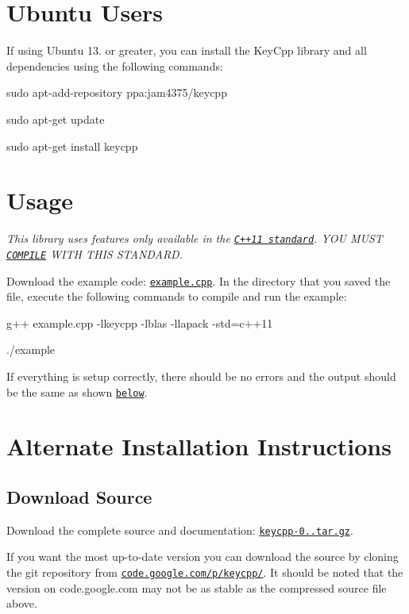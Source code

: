 \section*{Ubuntu Users}

If using Ubuntu 13. or greater, you can install the Key\-Cpp library and all dependencies using the following commands\-:

{\ttfamily sudo apt-\/add-\/repository ppa\-:jam4375/keycpp}

{\ttfamily sudo apt-\/get update}

{\ttfamily sudo apt-\/get install keycpp}

\section*{\label{_usage}%
Usage}

{\itshape This library uses features only available in the \href{https://en.wikipedia.org/wiki/C%2B%2B11}{\tt C++11 standard}. Y\-O\-U M\-U\-S\-T \href{http://gcc.gnu.org/projects/cxx0x.html}{\tt C\-O\-M\-P\-I\-L\-E} W\-I\-T\-H T\-H\-I\-S S\-T\-A\-N\-D\-A\-R\-D.}

Download the example code\-: \href{examples/example.cpp}{\tt example.\-cpp}. In the directory that you saved the file, execute the following commands to compile and run the example\-:

{\ttfamily g++ example.\-cpp -\/lkeycpp -\/lblas -\/llapack -\/std=c++11}

{\ttfamily ./example}

If everything is setup correctly, there should be no errors and the output should be the same as shown \href{#output}{\tt below}.

\section*{\label{_alt_install}%
Alternate Installation Instructions}

\subsection*{Download Source}

Download the complete source and documentation\-: \href{releases/keycpp-0.1.tar.gz}{\tt keycpp-\/0..\-tar.\-gz}.

If you want the most up-\/to-\/date version you can download the source by cloning the git repository from \href{http://code.google.com/p/keycpp/source/checkout}{\tt code.\-google.\-com/p/keycpp/}. It should be noted that the version on code.\-google.\-com may not be as stable as the compressed source file above.

